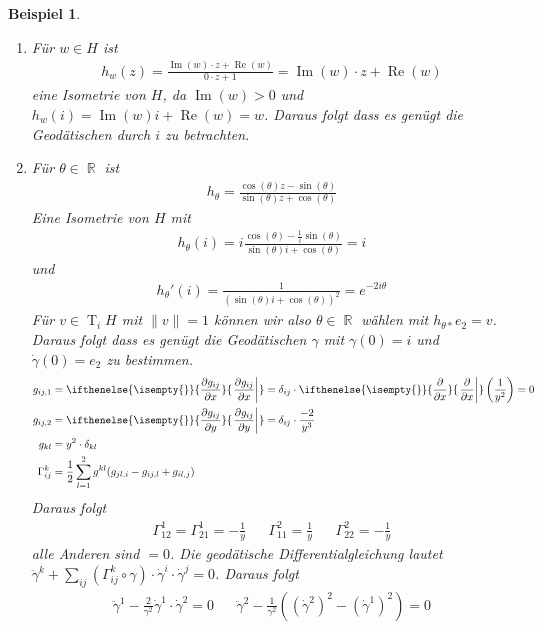 \documentclass[paper=A4, twoside, chapterprefix=true, bibliography=totoc, headsepline]{scrbook}
\let\temp\phi{}
\let\phi\varphi{}
\let\varphi\temp{}
\let\temp\theta{}
\let\theta\vartheta{}
\let\vartheta\temp{}
\let\temp\epsilon{}
\let\epsilon\varepsilon{}
\let\varepsilon\temp{}
\let\temp\rho{}
\let\rho\varrho{}
\let\varrho\temp{}
\DeclareMathOperator{\R}{\mathbb{R}}
\DeclareMathOperator{\T}{T}         %
\renewcommand{\Re}{\ensuremath{\operatorname{Re}}}
\renewcommand{\Im}{\ensuremath{\operatorname{Im}}}
\newcommand{\pdifffrac}[3][]{\ifthenelse{\isempty{#1}}{\frac{\partial #2}{\partial #3}}{\left. \frac{\partial #2}{\partial #3} \right|_{#1}}}
\theoremstyle{plain}
\theoremstyle{nonumberplain}
\newtheorem{bsp}{Beispiel}
\theoremstyle{empty}
\theoremstyle{break}
\newcommand{\quot}[1]{\textrm{\glqq}{#1}\textrm{\grqq}}
\begin{document}
\begin{bsp}\begin{enumerate}[label=(\arabic*),leftmargin=*]
\item
	F\"ur $w \in H$ ist
	\begin{align*}
		h_w(z) = \frac{\Im(w) \cdot z + \Re(w)}{0 \cdot z + 1} = \Im(w) \cdot z + \Re(w)
	\end{align*}
	eine Isometrie von $H$, da $\Im(w) > 0$ und $h_w(i) = \Im(w) i + \Re(w) = w$. Daraus folgt dass es gen\"ugt die Geod\"atischen durch $i$ zu betrachten.
\item
	F\"ur $\vartheta \in \R$ ist
	\begin{align*}
		h_\vartheta = \frac{\cos(\vartheta)z - \sin(\vartheta)}{\sin(\vartheta)z + \cos(\vartheta)}
	\end{align*}
	Eine Isometrie von $H$ mit
	\begin{align*}
		h_\vartheta(i) = i \frac{\cos(\vartheta) - \frac{1}{i} \sin(\vartheta)}{\sin(\vartheta) i + \cos(\vartheta)} = i
	\end{align*}
	und
	\begin{align*}
		h_{\vartheta}'(i) = \frac{1}{(\sin(\vartheta) i + \cos(\vartheta))^2} = e^{-2i\vartheta}
	\end{align*}
	F\"ur $v \in \T_iH$ mit $\|v\| = 1$ k\"onnen wir also $\vartheta \in \R$ w\"ahlen mit $h_{\vartheta *}e_2 = v$.
	Daraus folgt dass es gen\"ugt die Geod\"atischen $\gamma$ mit $\gamma(0) = i$ und $\dot\gamma(0) = e_2$ zu bestimmen.
	\begin{align*}
		g_{ij,1} &= \pdifffrac{g_{ij}}{x} = \delta_{ij} \cdot \pdifffrac{}{x} \left( \frac{1}{y^2} \right) = 0 \\
		g_{ij,2} &= \pdifffrac{g_{ij}}{y} = \delta_{ij} \cdot \frac{-2}{y^3} \\
		g_{kl} &= y^2 \cdot \delta_{kl} \\
		\Gamma_{ij}^k &= \frac{1}{2} \sum_{l=1}^2 g^{kl} (g_{jl,i} - g_{ij,l} + g_{il,j})
	\end{align*}
	Daraus folgt
	\begin{align*}
		\Gamma_{12}^1 = \Gamma_{21}^1 = - \frac{1}{y} && \Gamma_{11}^2 = \frac{1}{y} && \Gamma_{22}^2 = - \frac{1}{y}
	\end{align*}
	alle Anderen sind \quot{$=0$}.
	Die geod\"atische Differentialgleichung lautet $\ddot\gamma^k + \sum_{ij} (\Gamma_{ij}^k \circ \gamma) \cdot \dot\gamma^{i} \cdot \dot\gamma^j = 0$. Daraus folgt
	\begin{align*}
		\ddot\gamma^1 - \frac{2}{\gamma^2} \dot\gamma^1 \cdot \dot\gamma^2 = 0 && \ddot\gamma^2 - \frac{1}{\gamma^2} ((\dot\gamma^2)^2 - (\dot\gamma^1)^2) = 0

\end{align*}
\end{enumerate}
\end{bsp}
\end{document}
